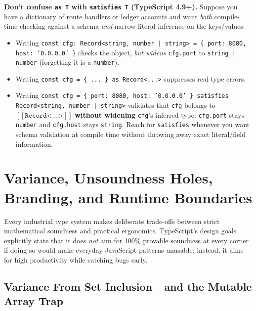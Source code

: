 \begin{labbox}
\textbf{Don't confuse \texttt{as T} with \texttt{satisfies T} (TypeScript 4.9+).} Suppose you have a dictionary of route handlers or ledger accounts and want \emph{both} compile-time checking against a schema \emph{and} narrow literal inference on the keys/values:
\begin{itemize}
  \item Writing \texttt{const cfg: Record<string, number | string> = \{ port: 8080, host: '0.0.0.0' \}} checks the object, \emph{but widens} \texttt{cfg.port} to \texttt{string | number} (forgetting it is a \texttt{number}).
  \item Writing \texttt{const cfg = \{ ... \} as Record<...>} suppresses real type errors.
  \item Writing \texttt{const cfg = \{ port: 8080, host: '0.0.0.0' \} satisfies Record<string, number | string>} validates that \texttt{cfg} belongs to $[\![ \texttt{Record<...>} ]\!]$ \textbf{without widening} \texttt{cfg}'s inferred type: \texttt{cfg.port} stays \texttt{number} and \texttt{cfg.host} stays \texttt{string}. Reach for \texttt{satisfies} whenever you want schema validation at compile time without throwing away exact literal/field information.
\end{itemize}
\end{labbox}

\section{Variance, Unsoundness Holes, Branding, and Runtime Boundaries}
\label{ch09:variance-branding-boundaries}

Every industrial type system makes deliberate trade-offs between strict mathematical soundness and practical ergonomics. TypeScript's design goals explicitly state that it does \emph{not} aim for 100\% provable soundness at every corner if doing so would make everyday JavaScript patterns unusable; instead, it aims for high productivity while catching bugs early. 

\subsection{Variance From Set Inclusion---and the Mutable Array Trap}

